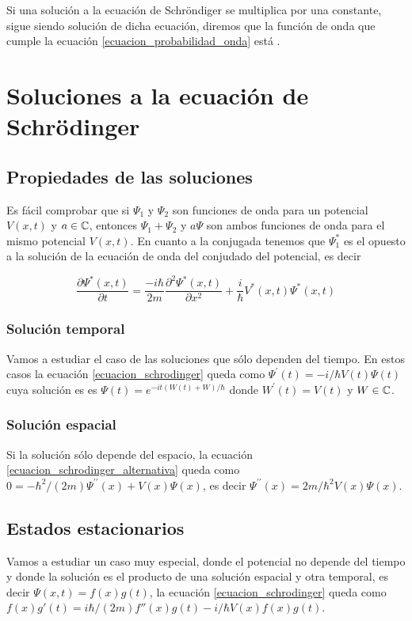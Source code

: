 Si una solución a la ecuación de Schröndiger se multiplica por una constante, sigue siendo solución de dicha ecuación, diremos que la función de onda que cumple la ecuación \ref{ecuacion_probabilidad_onda} está .


\section{Soluciones a la ecuación de Schrödinger}

\subsection{Propiedades de las soluciones}
Es fácil comprobar que si $\Psi_1$ y $\Psi_2$ son funciones de onda para un potencial $V(x,t)$ y $a\in\mathbb{C}$, entonces $\Psi_1+\Psi_2$ y $a\Psi$ son ambos funciones de onda para el mismo potencial $V(x,t)$. En cuanto a la conjugada tenemos que $\Psi^*_1$ es el opuesto a la solución de la ecuación de onda del conjudado del potencial, es decir

\begin{equation}
    \label{ecuacion_schrodinger_conjugada}
    \frac{\partial\Psi^*(x,t)}{\partial t}=\frac{-i\hbar}{2m}\frac{\partial^2\Psi^*(x,t)}{\partial x^2}+\frac{i}{\hbar}V^*(x,t)\Psi^*(x,t)
\end{equation}

\subsubsection{Solución temporal}
Vamos a estudiar el caso de las soluciones que sólo dependen del tiempo. En estos casos la ecuación \ref{ecuacion_schrodinger} queda como $\Psi^\prime(t) = -i/\hbar V(t)\Psi(t)$ cuya solución es es $\Psi(t)=e^{-it(W(t)+W)/\hbar}$ donde $W^\prime (t)=V(t)$ y $W\in\mathbb{C}$.

\subsubsection{Solución espacial}
Si la solución sólo depende del espacio, la ecuación \ref{ecuacion_schrodinger_alternativa} queda como $0=-\hbar^2/(2m)\Psi^{\prime\prime}(x)+V(x)\Psi(x)$, es decir $\Psi^{\prime\prime}(x)=2m/\hbar^2 V(x)\Psi(x)$.

\subsection{Estados estacionarios}
Vamos a estudiar un caso muy especial, donde el potencial no depende del tiempo y donde la solución es el producto de una solución espacial y otra temporal, es decir $\Psi(x,t)=f(x)g(t)$, la ecuación \ref{ecuacion_schrodinger} queda como $f(x)g'(t)=i\hbar/(2m)f''(x)g(t)-i/\hbar V(x)f(x)g(t)$.


